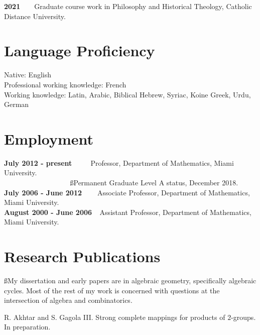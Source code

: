\documentclass[overlapped,line,letterpaper]{res}
\begin{document}
\begin{resume}
\textbf{2021} ~ ~ Graduate course work in Philosophy and Historical Theology, Catholic Distance University. \\


\large
\section{\bf Language Proficiency}
\vspace{3mm}
\normalsize

Native: English \\
Professional working knowledge: French \\
Working knowledge: Latin, Arabic, Biblical Hebrew, Syriac, Koine Greek, Urdu, German



\large
\section{\bf Employment}
\vspace{3 mm}
\normalsize
\textbf{July 2012 - present     } $ ~ ~  ~ ~ ~ ~ ~ ~ ~$ Professor, Department of Mathematics, Miami University. \\
$~ ~ ~ ~ ~ ~ ~ ~ ~ ~ ~  ~ ~ ~ ~  ~ ~ ~ ~  ~ ~ ~ ~ ~ ~ ~ ~ ~~ ~ ~  ~  ~ ~ ~ ~ ~~ ~ ~ ~  $ {\ss Permanent Graduate Level A status, December 2018.} \\
\textbf{July 2006 - June 2012} $ ~ ~ ~ ~ ~ ~ ~ $ Associate Professor, Department of Mathematics, Miami University. \\
\textbf{August 2000 - June 2006} $ ~ ~ $ Assistant Professor, Department of Mathematics, Miami University. \\






\large 
\section{\bf Research Publications}
\vspace{3 mm} 
\normalsize

{\ss My dissertation and early papers are in 
algebraic geometry, specifically algebraic cycles.  Most of the 
rest of my work is concerned with questions at the intersection of algebra and 
combinatorics.}

\smallskip
R. Akhtar and S. Gagola III. Strong complete mappings for products of $2$-groups. In preparation.


\end{resume}
\end{document}
